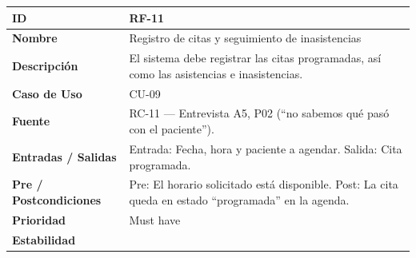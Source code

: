 \documentclass[
]{article}
\newcounter{none} %
\begin{document}
{\def\LTcaptype{none} %
\begin{longtable}[]{|
  >{\raggedright\arraybackslash}p{}|
  >{\raggedright\arraybackslash}p{}|}
\hline
\begin{minipage}[b]{\linewidth}\raggedright
\textbf{ID}
\end{minipage} & \begin{minipage}[b]{\linewidth}\raggedright
RF-11
\end{minipage} \\
\hline
\endhead
\hline
\endlastfoot
\textbf{Nombre} & \begin{minipage}[t]{\linewidth}\raggedright
Registro de citas y seguimiento de inasistencias
\end{minipage} \\
\hline
\textbf{Descripción} & \begin{minipage}[t]{\linewidth}\raggedright
El sistema debe registrar las citas programadas, así como las asistencias e inasistencias.
\end{minipage} \\
\hline
\textbf{Caso de Uso} & \begin{minipage}[t]{\linewidth}\raggedright
CU-09
\end{minipage} \\
\hline
\textbf{Fuente} & \begin{minipage}[t]{\linewidth}\raggedright
RC-11 — Entrevista A5, P02 (“no sabemos qué pasó con el paciente”).
\end{minipage} \\
\hline
\textbf{Entradas / Salidas} & \begin{minipage}[t]{\linewidth}\raggedright
Entrada: Fecha, hora y paciente a agendar. Salida: Cita programada.
\end{minipage} \\
\hline
\textbf{Pre / Postcondiciones} & \begin{minipage}[t]{\linewidth}\raggedright
Pre: El horario solicitado está disponible. Post: La cita queda en estado “programada” en la agenda.
\end{minipage} \\
\hline
\textbf{Prioridad} & \begin{minipage}[t]{\linewidth}\raggedright
Must have
\end{minipage} \\
\hline
\textbf{Estabilidad} & \begin{minipage}[t]{\linewidth}\raggedright

\end{minipage}
\end{longtable}}
\end{document}
